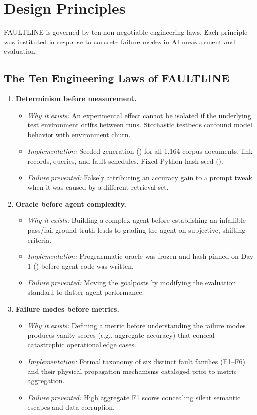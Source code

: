 \section{Design Principles}

FAULTLINE is governed by ten non-negotiable engineering laws. Each principle was instituted in response to concrete failure modes in AI measurement and evaluation:

\subsection{The Ten Engineering Laws of FAULTLINE}

\begin{enumerate}
    \item \textbf{Determinism before measurement.}
    \begin{itemize}
        \item \textit{Why it exists:} An experimental effect cannot be isolated if the underlying test environment drifts between runs. Stochastic testbeds confound model behavior with environment churn.
        \item \textit{Implementation:} Seeded generation () for all 1,164 corpus documents, link records, queries, and fault schedules. Fixed Python hash seed ().
        \item \textit{Failure prevented:} Falsely attributing an accuracy gain to a prompt tweak when it was caused by a different retrieval set.
    \end{itemize}

    \item \textbf{Oracle before agent complexity.}
    \begin{itemize}
        \item \textit{Why it exists:} Building a complex agent before establishing an infallible pass/fail ground truth leads to grading the agent on subjective, shifting criteria.
        \item \textit{Implementation:} Programmatic oracle  was frozen and hash-pinned on Day 1 () before agent code was written.
        \item \textit{Failure prevented:} Moving the goalposts by modifying the evaluation standard to flatter agent performance.
    \end{itemize}

    \item \textbf{Failure modes before metrics.}
    \begin{itemize}
        \item \textit{Why it exists:} Defining a metric before understanding the failure modes produces vanity scores (e.g., aggregate accuracy) that conceal catastrophic operational edge cases.
        \item \textit{Implementation:} Formal taxonomy of six distinct fault families (F1--F6) and their physical propagation mechanisms cataloged prior to metric aggregation.
        \item \textit{Failure prevented:} High aggregate F1 scores concealing silent semantic escapes and data corruption.
    \end{itemize}


\end{enumerate}
